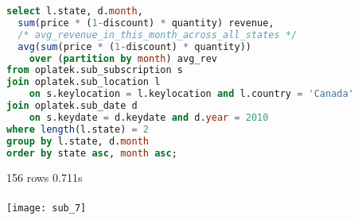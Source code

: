 \begin{enumerate}
\begin{lstlisting}[language=sql] 
select l.state, d.month, 
  sum(price * (1-discount) * quantity) revenue,
  /* avg_revenue_in_this_month_across_all_states */
  avg(sum(price * (1-discount) * quantity)) 
    over (partition by month) avg_rev 
from oplatek.sub_subscription s 
join oplatek.sub_location l 
    on s.keylocation = l.keylocation and l.country = 'Canada' 
join oplatek.sub_date d 
    on s.keydate = d.keydate and d.year = 2010
where length(l.state) = 2
group by l.state, d.month
order by state asc, month asc;
\end{lstlisting}
      156 rows 0.711s\\ \\
      \texttt{[image: sub\_7]}
\end{enumerate}

